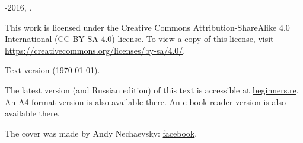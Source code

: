 ﻿\begin{titlepage}


\end{titlepage}

\newpage

\begin{center}
\vspace*{\fill}
{\LARGE \TITLE}

\vspace*{\fill}

{\large \AUTHOR}

{\large \TT{<\EMAIL>}}
\vspace*{\fill}
\vfill

\ccbysa

-2016, \AUTHOR. 

This work is licensed under the Creative Commons Attribution-ShareAlike 4.0 International (CC BY-SA 4.0) license.
To view a copy of this license, visit \url{https://creativecommons.org/licenses/by-sa/4.0/}.

Text version ({\large \today}).

The latest version (and Russian edition) of this text is accessible at \href{http://go.yurichev.com/17009}{beginners.re}.
\ifdefined\ebook
An A4-format version is also available there.
\else
An e-book reader version is also available there.
\fi

The cover was made by Andy Nechaevsky: \href{http://go.yurichev.com/17023}{facebook}.

\end{center}
